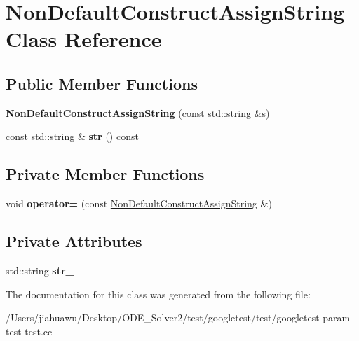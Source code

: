 \hypertarget{class_non_default_construct_assign_string}{}\section{Non\+Default\+Construct\+Assign\+String Class Reference}
\label{class_non_default_construct_assign_string}
\subsection*{Public Member Functions}
\begin{DoxyCompactItemize}
\item 
\mbox{\label{class_non_default_construct_assign_string_a85e34ec502250fb18edd56a86353d20d}} 
{\bfseries Non\+Default\+Construct\+Assign\+String} (const std\+::string \&s)
\item 
\mbox{\label{class_non_default_construct_assign_string_a7b428e839204101cb3b7f5b14a66688c}} 
const std\+::string \& {\bfseries str} () const
\end{DoxyCompactItemize}
\subsection*{Private Member Functions}
\begin{DoxyCompactItemize}
\item 
\mbox{\label{class_non_default_construct_assign_string_affc4454f81eb10342ddb98c0ff0f424d}} 
void {\bfseries operator=} (const \mbox{\hyperlink{class_non_default_construct_assign_string}{Non\+Default\+Construct\+Assign\+String}} \&)
\end{DoxyCompactItemize}
\subsection*{Private Attributes}
\begin{DoxyCompactItemize}
\item 
\mbox{\label{class_non_default_construct_assign_string_a07f7e8d268e2ebb2188ad47471904351}} 
std\+::string {\bfseries str\+\_\+}
\end{DoxyCompactItemize}


The documentation for this class was generated from the following file\+:\begin{DoxyCompactItemize}
\item 
/\+Users/jiahuawu/\+Desktop/\+O\+D\+E\+\_\+\+Solver2/test/googletest/test/googletest-\/param-\/test-\/test.\+cc\end{DoxyCompactItemize}
